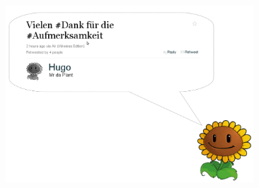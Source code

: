 \documentclass[bigger]{beamer}
\begin{document}
{
%
\begin{frame}{}
	\begin{figure}[H]
		\includegraphics[width=350px]{Danke.png}
	\end{figure}
\end{frame}
}
\end{document}
